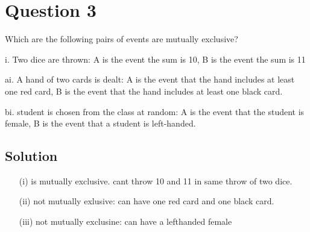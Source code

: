




\section*{Question 3}


Which are the following pairs of events are mutually exclusive?

i.
Two dice are thrown: A is the event the sum is 10, B is the event the sum is 11


ai.
A hand of two cards is dealt: A is the event that the hand includes at least one red card, B is the event that the hand includes at least one black card.


bi.
student is chosen from the class at random: A is the event that the student is female, B is the event that a student is left-handed.









\subsection*{Solution}

\begin{itemize}
\item[(i)] is mutually exclusive. cant throw 10 and 11 in same throw of two dice.


\item[(ii)] not mutually exlusive: can have one red card and one black card.


\item[(iii)] not mutually exclusine: can have a lefthanded female
\end{itemize}


